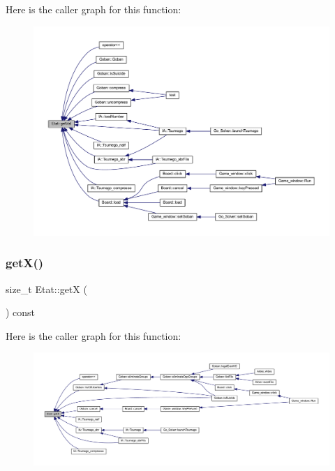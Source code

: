 Here is the caller graph for this function\+:
\nopagebreak
\begin{figure}[H]
\begin{center}
\leavevmode
\includegraphics[width=350pt]{class_etat_ac0b81bbcf64cb3cc574e5a9dcdf94382_icgraph}
\end{center}
\end{figure}
\mbox{\label{class_etat_aa25e66b110bc835523819392435e78c6}} 
\subsubsection{\texorpdfstring{get\+X()}{getX()}}
{\footnotesize\ttfamily size\+\_\+t Etat\+::getX (\begin{DoxyParamCaption}{ }\end{DoxyParamCaption}) const}

Here is the caller graph for this function\+:
\nopagebreak
\begin{figure}[H]
\begin{center}
\leavevmode
\includegraphics[width=350pt]{class_etat_aa25e66b110bc835523819392435e78c6_icgraph}
\end{center}
\end{figure}
\mbox{\label{class_etat_a3e3e915f2261c83989a983e84b1273c1}} 
